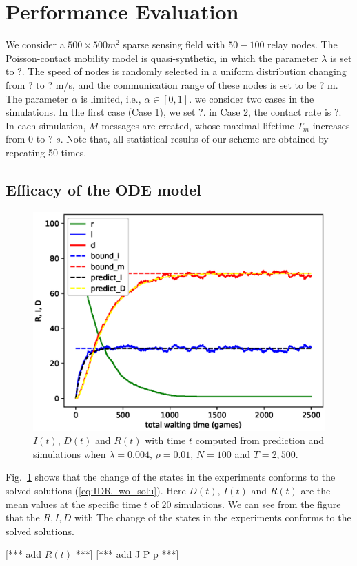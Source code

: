 \section{Performance Evaluation}
\label{sec:pe}
We consider a $500 \times 500 m^2$ sparse sensing field with
$50-100$ relay nodes.
The Poisson-contact
mobility model is quasi-synthetic,
in which the parameter $\lambda$ is set to ?.
The speed of nodes is randomly selected in a uniform distribution changing from ? to ? m/s,
and the communication range of
these nodes is set to be ? m.
The parameter $\alpha$ is limited, i.e.,
$\alpha \in [0, 1]$.
we consider two cases in the simulations.
In the first case (Case 1),
we set ?.
in Case 2,
the contact rate
is ?.
In each simulation,
$M$ messages are created,
whose maximal lifetime $T_m$ increases from $0$ to ? $s$.
Note that,
all statistical results of our scheme are obtained by
repeating 50 times.

\subsection{Efficacy of the ODE model}
\label{subsec:pe_valid}
\begin{figure}
  \includegraphics[width=.45\textwidth]{fig/twohop_without_detection.eps}
  \caption{$I(t)$, $D(t)$ and $R(t)$ with time $t$ computed from prediction and simulations
  when $\lambda = 0.004$, $\rho = 0.01$, $N=100$ and $T=2,500$.}
  \label{fig:twohop_predict_wod}
\end{figure}
Fig.~\ref{fig:twohop_predict_wod} shows that the change of the states
in the experiments conforms to the solved solutions (\ref{eq:IDR_wo_solu}).
Here $D(t)$, $I(t)$ and $R(t)$ are the mean values
at the specific time $t$ of $20$ simulations.
We can see from the figure that the $R,I,D$ with
The change of the states
in the experiments conforms to
the solved solutions.

[*** add $R(t)$ ***]
[*** add J P p ***]

